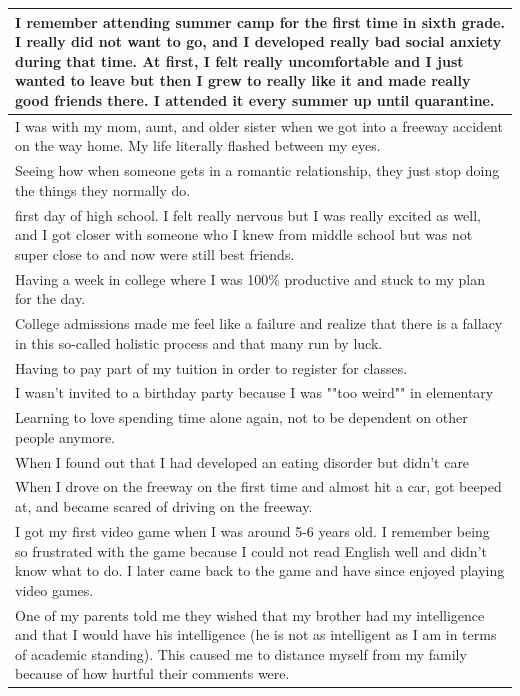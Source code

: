 \documentclass[
  .7em,
  letterpaper,
  DIV=11,
  numbers=noendperiod]{scrartcl}
\begin{document}
\begin{table}
\begin{tabular}{l}
\hline
I remember attending summer camp for the first time in sixth grade. I really did not want to go, and I developed really bad social anxiety during that time. At first, I felt really uncomfortable and I just wanted to leave but then I grew to really like it and made really good friends there. I attended it every summer up until quarantine.\\
\hline
I was with my mom, aunt, and older sister when we got into a freeway accident on the way home. My life literally flashed between my eyes.\\
\hline
Seeing how when someone gets in a romantic relationship, they just stop doing the things they normally do.\\
\hline
first day of high school. I felt really nervous but I was really excited as well, and I got closer with someone who I knew from middle school but was not super close to and now were still best friends.\\
\hline
Having a week in college where I was 100\% productive and stuck to my plan for the day.\\
\hline
College admissions made me feel like a failure and realize that there is a fallacy in this so-called holistic process and that many run by luck.\\
\hline
Having to pay part of my tuition in order to register for classes.\\
\hline
I wasn't invited to a birthday party because I was ""too weird"" in elementary\\
\hline
Learning to love spending time alone again, not to be dependent on other people anymore.\\
\hline
When I found out that I had developed an eating disorder but didn’t care\\
\hline
When I drove on the freeway on the first time and almost hit a car, got beeped at, and became scared of driving on the freeway.\\
\hline
I got my first video game when I was around 5-6 years old. I remember being so frustrated with the game because I could not read English well and didn’t know what to do. I later came back to the game and have since enjoyed playing video games.\\
\hline
One of my parents told me they wished that my brother had my intelligence and that I would have his intelligence (he is not as intelligent as I am in terms of academic standing). This caused me to distance myself from my family because of how hurtful their comments were.\\

\end{tabular}
\end{table}
\end{document}
